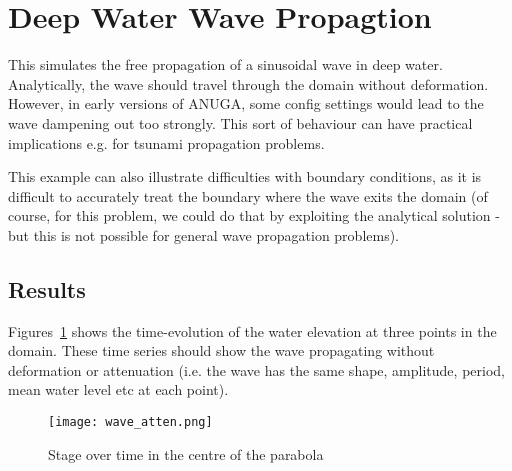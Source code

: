 \section{Deep Water Wave Propagtion}
This simulates the free propagation of a sinusoidal wave in deep water. Analytically, the wave should travel through the domain without deformation. However, in early versions of ANUGA, some config settings would lead to the wave dampening out too strongly. This sort of behaviour can have practical implications e.g. for tsunami propagation problems.  

This example can also illustrate difficulties with boundary conditions, as it is difficult to accurately treat the boundary where the wave exits the domain (of course, for this problem, we could do that by exploiting the analytical solution - but this is not possible for general wave propagation problems).

\subsection{Results}
Figures~\ref{stagewave} shows the time-evolution of the water elevation at three points in the domain. These time series should show the wave propagating without deformation or attenuation (i.e. the wave has the same shape, amplitude, period, mean water level etc at each point).  
\begin{figure}[h]
\begin{center}
\texttt{[image: wave\_atten.png]}
\caption{Stage over time in the centre of the parabola}
\label{stagewave}
\end{center}
\end{figure}



\endinput

